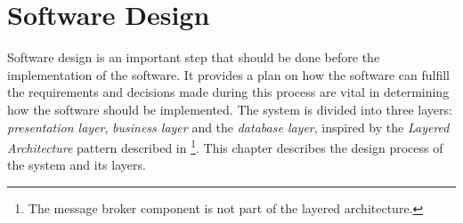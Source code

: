 \section{Software Design}

Software design is an important step that should be done before the implementation of the software. It provides a plan on how the software can fulfill the requirements and decisions made during this process are vital in determining how the software should be implemented. The system is divided into three layers: \emph{presentation layer}, \emph{business layer} and the \emph{database layer}, inspired by the \emph{Layered Architecture} pattern described in \autocite{richards2015software}\footnote{The message broker component is not part of the layered architecture.}. This chapter describes the design process of the system and its layers. 



 